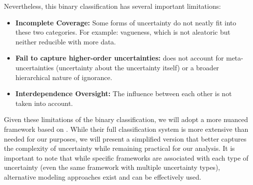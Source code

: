 Nevertheless, this binary classification has several important limitations:

\begin{itemize}
    \item \textbf{Incomplete Coverage:} Some forms of uncertainty do not neatly fit into these two categories. For example: vagueness, which is not aleatoric but neither reducible with more data.
    \item \textbf{Fail to capture higher-order uncertainties:} does not account for meta-uncertainties (uncertainty about the uncertainty itself) or a broader hierarchical nature of ignorance.
    \item \textbf{Interdependence Oversight:} The influence between each other is not taken into account.
\end{itemize}

Given these limitations of the binary classification, we will adopt a more nuanced framework based on \cite{UncertaintySciences}. While their full classification system is more extensive than needed for our purposes, we will present a simplified version that better captures the complexity of uncertainty while remaining practical for our analysis. It is important to note that while specific frameworks are associated with each type of uncertainty (even the same framework with multiple uncertainty types), alternative modeling approaches exist and can be effectively used.


